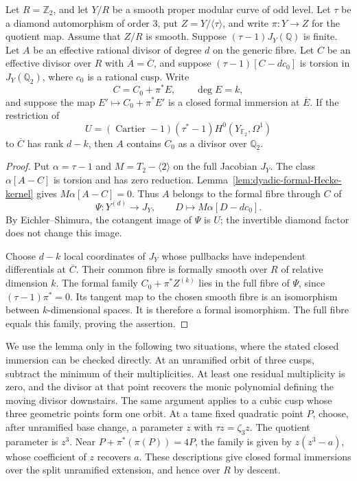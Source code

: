 \begin{lemma}\label{lem:decic91-relative-formal-fibre}
Let $R=\mathbb Z_2$, and let $Y/R$ be a smooth proper modular curve of odd level.
Let $\tau$ be a diamond automorphism of order $3$, put $Z=Y/\langle\tau\rangle$,
and write $\pi:Y\longrightarrow Z$ for the quotient map.
Assume that $Z/R$ is smooth.
Suppose $(\tau-1)J_Y(\mathbb Q)$ is finite.
Let $A$ be an effective rational divisor of degree $d$ on the generic fibre.
Let $C$ be an effective divisor over $R$ with $\overline A=\overline C$, and suppose
$(\tau-1)[C-dc_0]$ is torsion in $J_Y(\mathbb Q_2)$, where $c_0$ is a rational cusp.
Write
\[
 C=C_0+\pi^*E,\qquad \deg E=k,
\]
and suppose the map $E'\mapsto C_0+\pi^*E'$ is a closed formal immersion
at $\overline E$. If the restriction of
\[
 U=(\operatorname{Cartier}-1)(\tau^*-1)H^0(Y_{\mathbb F_2},\Omega^1)
\]
to $\overline C$ has rank $d-k$, then $A$ contains $C_0$ as a divisor over $\mathbb Q_2$.
\end{lemma}
\begin{proof}
Put $\alpha=\tau-1$ and $M=T_2-\langle2\rangle$ on the full Jacobian $J_Y$.
The class $\alpha[A-C]$ is torsion and has zero reduction.
Lemma~\ref{lem:dyadic-formal-Hecke-kernel} gives $M\alpha[A-C]=0$.
Thus $A$ belongs to the formal fibre through $C$ of
\[
 \Psi:Y^{(d)}\longrightarrow J_Y,\qquad
 D\longmapsto M\alpha[D-dc_0].
\]
By Eichler--Shimura, the cotangent image of $\Psi$ is $U$;
the invertible diamond factor does not change this image.

Choose $d-k$ local coordinates of $J_Y$ whose pullbacks have independent
differentials at $\overline C$.
Their common fibre is formally smooth over $R$ of relative dimension $k$.
The formal family $C_0+\pi^*Z^{(k)}$ lies in the full fibre of $\Psi$,
since $(\tau-1)\pi^*=0$.
Its tangent map to the chosen smooth fibre is an isomorphism between
$k$-dimensional spaces. It is therefore a formal isomorphism.
The full fibre equals this family, proving the assertion.
\end{proof}

We use the lemma only in the following two situations, where the stated
closed immersion can be checked directly. At an unramified orbit of three
cusps, subtract the minimum of their multiplicities. At least one residual
multiplicity is zero, and the divisor at that point recovers the monic
polynomial defining the moving divisor downstairs. The same argument applies
to a cubic cusp whose three geometric points form one orbit.
At a tame fixed quadratic point $P$, choose, after unramified base change,
a parameter $z$ with $\tau z=\zeta_3z$. The quotient parameter is $z^3$.
Near $P+\pi^*(\pi(P))=4P$, the family is given by
$z(z^3-a)$, whose coefficient of $z$ recovers $a$.
These descriptions give closed formal immersions over the split unramified
extension, and hence over $R$ by descent.
